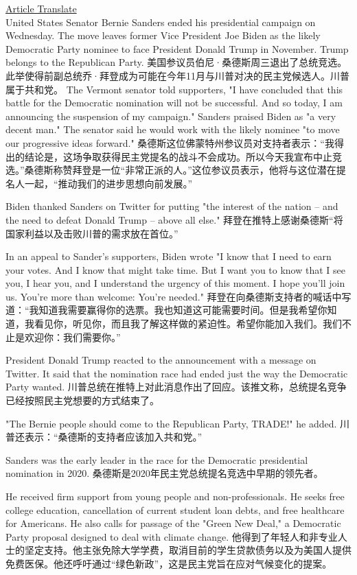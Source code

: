 \href{https://www.51voa.com/VOA_Special_English/sanders-ends-campaign-biden-likely-to-face-trump-84288_1.html}{Article Translate} \\

United States Senator Bernie Sanders ended his presidential campaign on Wednesday. The move leaves former Vice President Joe Biden as the likely Democratic Party nominee to face President Donald Trump in November. Trump belongs to the Republican Party.
美国参议员伯尼·桑德斯周三退出了总统竞选。此举使得前副总统乔·拜登成为可能在今年11月与川普对决的民主党候选人。川普属于共和党。
The Vermont senator told supporters, "I have concluded that this battle for the Democratic nomination will not be successful. And so today, I am announcing the suspension of my campaign." Sanders praised Biden as "a very decent man." The senator said he would work with the likely nominee "to move our progressive ideas forward."
桑德斯这位佛蒙特州参议员对支持者表示：“我得出的结论是，这场争取获得民主党提名的战斗不会成功。所以今天我宣布中止竞选。”桑德斯称赞拜登是一位“非常正派的人。”这位参议员表示，他将与这位潜在提名人一起，“推动我们的进步思想向前发展。”

Biden thanked Sanders on Twitter for putting "the interest of the nation – and the need to defeat Donald Trump – above all else."
拜登在推特上感谢桑德斯“将国家利益以及击败川普的需求放在首位。”

In an appeal to Sander's supporters, Biden wrote "I know that I need to earn your votes. And I know that might take time. But I want you to know that I see you, I hear you, and I understand the urgency of this moment. I hope you'll join us. You're more than welcome: You're needed."
拜登在向桑德斯支持者的喊话中写道：“我知道我需要赢得你的选票。我也知道这可能需要时间。但是我希望你知道，我看见你，听见你，而且我了解这样做的紧迫性。希望你能加入我们。我们不止是欢迎你：我们需要你。”

President Donald Trump reacted to the announcement with a message on Twitter. It said that the nomination race had ended just the way the Democratic Party wanted.
川普总统在推特上对此消息作出了回应。该推文称，总统提名竞争已经按照民主党想要的方式结束了。

"The Bernie people should come to the Republican Party, TRADE!" he added.
川普还表示：“桑德斯的支持者应该加入共和党。”

Sanders was the early leader in the race for the Democratic presidential nomination in 2020.
桑德斯是2020年民主党总统提名竞选中早期的领先者。

He received firm support from young people and non-professionals. He seeks free college education, cancellation of current student loan debts, and free healthcare for Americans. He also calls for passage of the "Green New Deal," a Democratic Party proposal designed to deal with climate change.
他得到了年轻人和非专业人士的坚定支持。他主张免除大学学费，取消目前的学生贷款债务以及为美国人提供免费医保。他还呼吁通过“绿色新政”，这是民主党旨在应对气候变化的提案。

